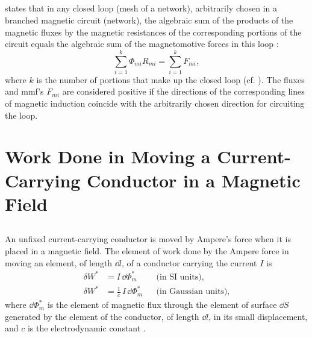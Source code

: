 \subsection{}\label{23.5.11}  states that in any closed loop (mesh of a network), arbitrarily chosen in a branched magnetic circuit (network), the algebraic sum of the products of the magnetic fluxes by the magnetic resistances of the corresponding portions of the circuit  equals the algebraic sum of the magnetomotive forces in this loop :
\begin{equation*}%
\sum_{i =1}^{k} \Phi_{mi} R_{mi}= \sum_{i =1}^{k} F_{mi},
\end{equation*}
where $k$ is the number of portions that make up the closed loop (cf. ). The fluxes and mmf's $F_{mi}$ are considered positive if the directions of the corresponding lines of magnetic induction  coincide with the arbitrarily chosen direction for circuiting the loop.

\section[Work Done in a Magnetic Field]{Work Done in Moving a Current-Carrying Conductor in a Magnetic Field}
\label{sec-23.6}

\subsection{}\label{23.6.1} An unfixed current-carrying conductor is moved by Ampere's force  when it is placed in a magnetic field. The element of work done by the Ampere force in moving an element, of length $\dd l$, of a conductor carrying the current $I$ is
\begin{align*}%
\delta W^{*} & = I \, \dd \Phi_{m}^{*} &&  \text{(in SI units),} \\
\delta W^{*} & = \frac{1}{c}\,I \, \dd \Phi_{m}^{*}&&  \text{(in Gaussian units),}
\end{align*}
where $\dd \Phi_{m}^{*}$ is the element of magnetic flux  through the element of surface $\dd S$ generated by the element of the conductor, of length $\dd l$, in its small displacement, and $c$ is the electrodynamic constant .


